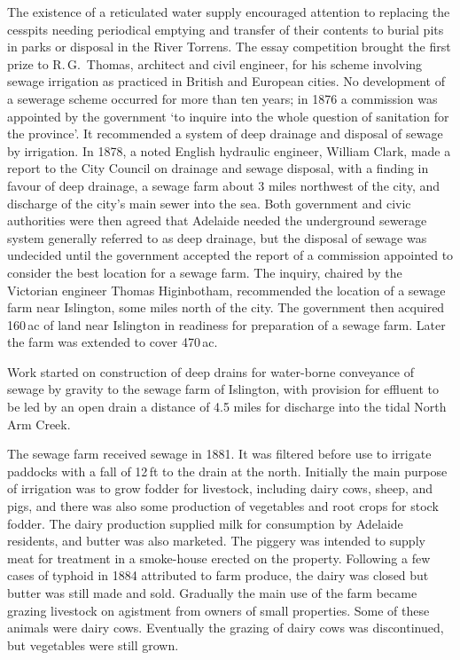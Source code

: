 The existence of a reticulated water supply encouraged attention to
replacing the cesspits needing periodical emptying and transfer of
their contents to burial pits in parks or disposal in the River
Torrens.  The essay competition brought the first prize to
R.\,G.~Thomas, architect and civil engineer, for his scheme involving
sewage irrigation as practiced in British and European cities.  No
development of a sewerage scheme occurred for more than ten years; in
1876 a commission was appointed by the government `to inquire into the
whole question of sanitation for the province'.  It recommended a
system of deep drainage and disposal of sewage by irrigation.  In
1878, a noted English hydraulic engineer, William Clark, made a report
to the City Council on drainage and sewage disposal, with a finding in
favour of deep drainage, a sewage farm about 3 miles northwest of the
city, and discharge of the city's main sewer into the sea.  Both
government and civic authorities were then agreed that Adelaide needed
the underground sewerage system generally referred to as deep
drainage, but the disposal of sewage was undecided until the
government accepted the report of a commission appointed to consider
the best location for a sewage farm.  The inquiry, chaired by the
Victorian engineer Thomas Higinbotham, recommended the location of a
sewage farm near Islington, some miles north of the city.  The
government then acquired 160\,ac of land near Islington in readiness
for preparation of a sewage farm. Later the farm was extended to cover
470\,ac.


Work started on construction of deep drains for water-borne conveyance
of sewage by gravity to the sewage farm of Islington, with provision
for effluent to be led by an open drain a distance of 4.5 miles for
discharge into the tidal North Arm Creek.

The sewage farm received sewage in 1881.  It was filtered before use
to irrigate paddocks with a fall of 12\,ft to the drain at the north.
Initially the main purpose of irrigation was to grow fodder for
livestock, including dairy cows, sheep, and pigs, and there was also
some production of vegetables and root crops for stock fodder.  The
dairy production supplied milk for consumption by Adelaide residents,
and butter was also marketed.  The piggery was intended to supply meat
for treatment in a smoke-house erected on the property.  Following a
few cases of typhoid in 1884 attributed to farm produce, the dairy was
closed but butter was still made and sold.  Gradually the main use of
the farm became grazing livestock on agistment from owners of small
properties.  Some of these animals were dairy cows.  Eventually the
grazing of dairy cows was discontinued, but vegetables were still
grown.

